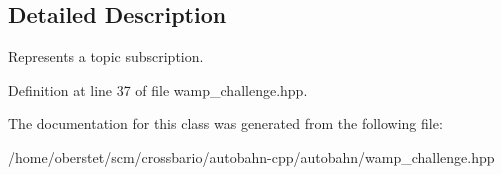 \subsection{Detailed Description}
Represents a topic subscription. 

Definition at line 37 of file wamp\+\_\+challenge.\+hpp.



The documentation for this class was generated from the following file\+:\begin{DoxyCompactItemize}
\item 
/home/oberstet/scm/crossbario/autobahn-\/cpp/autobahn/wamp\+\_\+challenge.\+hpp\end{DoxyCompactItemize}
